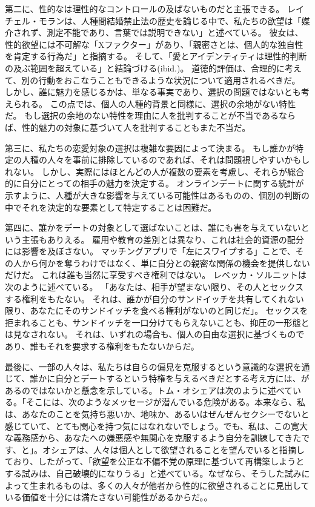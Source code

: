 \documentclass[paper=a4,book,openany]{jlreq}
\begin{document}
第二に、性的なは理性的なコントロールの及ばないものだと主張できる。
レイチェル・モランは、人種間結婚禁止法の歴史を論じる中で、私たちの欲望は「媒介されず、測定不能であり、言葉では説明できない」と述べている\citep[p. 14]{moran01:_inter_intim}。
彼女は、性的欲望には不可解な「Xファクター」があり、「親密さとは、個人的な独自性を肯定する行為だ」と指摘する。
そして、「愛とアイデンティティは理性的判断の及ぶ範囲を超えている」と結論づける(ibid.)。
道徳的評価は、合理的に考えて、別の行動をおこなうこともできるような状況について適用されるべきだ。
しかし、誰に魅力を感じるかは、単なる事実であり、選択の問題ではないとも考えられる。
この点では、個人の人種的背景と同様に、選択の余地がない特性だ。
もし選択の余地のない特性を理由に人を批判することが不当であるならば、性的魅力の対象に基づいて人を批判することもまた不当だ。

第三に、私たちの恋愛対象の選択は複雑な要因によって決まる。
もし誰かが特定の人種の人々を事前に排除しているのであれば、それは問題視しやすいかもしれない。
しかし、実際にはほとんどの人が複数の要素を考慮し、それらが総合的に自分にとっての相手の魅力を決定する。
オンラインデートに関する統計が示すように、人種が大きな影響を与えている可能性はあるものの、個別の判断の中でそれを決定的な要素として特定することは困難だ。

第四に、誰かをデートの対象として選ばないことは、誰にも害を与えていないという主張もありえる。
雇用や教育の差別とは異なり、これは社会的資源の配分には影響を及ぼさない。
マッチングアプリで「左にスワイプする」ことで、その人から何かを奪うわけではなく、単に自分との親密な関係の機会を提供しないだけだ。
これは誰も当然に享受すべき権利ではない。
レベッカ・ソルニットは次のように述べている。
「あなたは、相手が望まない限り、その人とセックスする権利をもたない。
それは、誰かが自分のサンドイッチを共有してくれない限り、あなたにそのサンドイッチを食べる権利がないのと同じだ」\citep{solnit15:_men_explain_lolit_me}。
セックスを拒まれることも、サンドイッチを一口分けてもらえないことも、抑圧の一形態とは見なされない。
それは、いずれの場合も、個人の自由な選択に基づくものであり、誰もそれを要求する権利をもたないからだ。

最後に、一部の人々は、私たちは自らの偏見を克服するという意識的な選択を通じて、誰かに自分とデートするという特権を与えるべきだとする考え方には、があるのではないかと懸念を示している。トム・オシェアは次のように述べている。「そこには、次のようなメッセージが潜んでいる危険がある。本来なら、私は、あなたのことを気持ち悪いか、地味か、あるいはぜんぜんセクシーでないと感じていて、とても関心を持つ気にはなれないでしょう。でも、私は、この寛大な義務感から、あなたへの嫌悪感や無関心を克服するよう自分を訓練してきたです、と」。オシェアは、人々は個人として欲望されることを望んでいると指摘しており、したがって、「欲望を公正な不偏不党の原理に基づいて再構築しようとする試みは、自己破壊的になりうる」と述べている。なぜなら、そうした試みによって生まれるものは、多くの人々が他者から性的に欲望されることに見出している価値を十分には満たさない可能性があるからだ\citep{oshea20:_sexual_desir_struc_injus}。。
\end{document}
